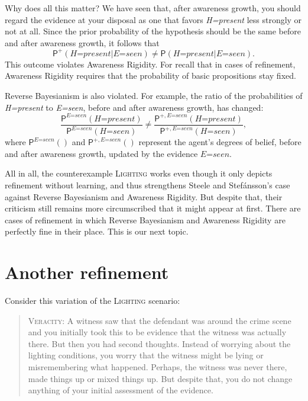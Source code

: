 \documentclass[
  11pt,
  dvipsnames,enabledeprecatedfontcommands]{scrartcl}
\newcommand{\pr}[1]{\ensuremath{\mathsf{P}(#1)}}
\newcommand{\ppr}[2]{\ensuremath{\mathsf{P}^{#1}(#2)}}
\begin{document}
Why does all this matter? We have seen that, after awareness growth, you
should regard the evidence at your disposal as one that favors
\textit{H=present} less strongly or not at all. Since the prior
probability of the hypothesis should be the same before and after
awareness growth, it follows that
\[\ppr{+}{\textit{H=present} \vert \textit{E=seen}} \neq \pr{\textit{H=present} \vert \textit{E=seen}}.\]
This outcome violates Awareness Rigidity. For recall that in cases of
refinement, Awareness Rigidity requires that the probability of basic
propositions stay fixed.

Reverse Bayesianism is also violated. For example, the ratio of the
probabilities of \textit{H=present} to \textit{E=seen}, before and after
awareness growth, has changed:
\[\frac{\ppr{\textit{E=seen}}{\textit{H=present}}}{\ppr{ \textit{E=seen}}{\textit{H=seen}}} \neq \frac{\ppr{+, \textit{E=seen}}{\textit{H=present}}}{\ppr{+, \textit{E=seen}}{\textit{H=seen}}},\]
where \(\ppr{\textit{E=seen}}{}\) and \(\ppr{+, \textit{E=seen}}{}\)
represent the agent's degrees of belief, before and after awareness
growth, updated by the evidence \(\textit{E=seen}\).

All in all, the counterexample \textsc{Lighting} works even though it
only depicts refinement without learning, and thus strengthens Steele
and Stefánsson's case against Reverse Bayesianism and Awareness
Rigidity. But despite that, their criticism still remains more
circumscribed that it might appear at first. There are cases of
refinement in which Reverse Bayesianism and Awareness Rigidity are
perfectly fine in their place. This is our next topic.

\hypertarget{another-refinement}{%
\section{Another refinement}\label{another-refinement}}

Consider this variation of the \textsc{Lighting} scenario:

\begin{quote}
\textsc{Veracity}: A witness saw that the defendant was around the crime
scene and you initially took this to be evidence that the witness was
actually there. But then you had second thoughts. Instead of worrying
about the lighting conditions, you worry that the witness might be lying
or misremembering what happened. Perhaps, the witness was never there,
made things up or mixed things up. But despite that, you do not change
anything of your initial assessment of the evidence.
\end{quote}
\end{document}

